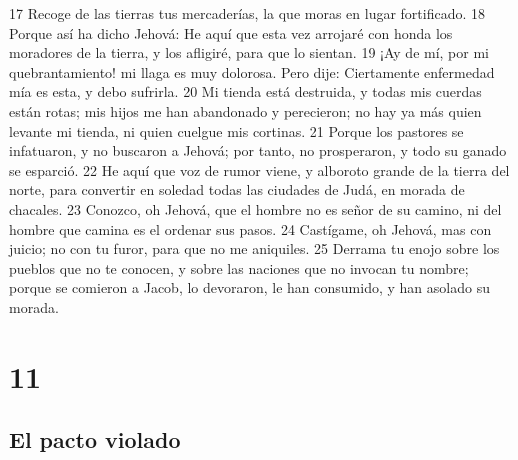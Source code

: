 17 Recoge de las tierras tus mercaderías, la que moras en lugar fortificado.
18 Porque así ha dicho Jehová: He aquí que esta vez arrojaré con honda los moradores de la tierra, y los afligiré, para que lo sientan.
19 ¡Ay de mí, por mi quebrantamiento! mi llaga es muy dolorosa. Pero dije: Ciertamente enfermedad mía es esta, y debo sufrirla.
20 Mi tienda está destruida, y todas mis cuerdas están rotas; mis hijos me han abandonado y perecieron; no hay ya más quien levante mi tienda, ni quien cuelgue mis cortinas.
21 Porque los pastores se infatuaron, y no buscaron a Jehová; por tanto, no prosperaron, y todo su ganado se esparció.
22 He aquí que voz de rumor viene, y alboroto grande de la tierra del norte, para convertir en soledad todas las ciudades de Judá, en morada de chacales.
23 Conozco, oh Jehová, que el hombre no es señor de su camino, ni del hombre que camina es el ordenar sus pasos.
24 Castígame, oh Jehová, mas con juicio; no con tu furor, para que no me aniquiles.
25 Derrama tu enojo sobre los pueblos que no te conocen, y sobre las naciones que no invocan tu nombre; porque se comieron a Jacob, lo devoraron, le han consumido, y han asolado su morada.

\chapter{11}

\section*{El pacto violado}

